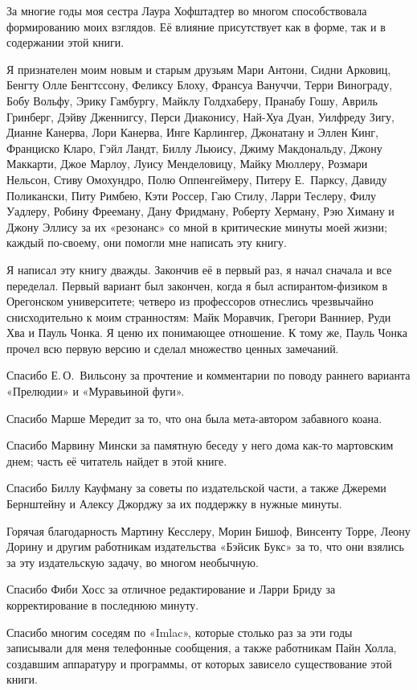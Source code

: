 \documentclass[../main.tex]{subfiles}
\begin{document}
За многие годы моя сестра Лаура Хофштадтер во многом способствовала формированию моих взглядов. Её влияние присутствует как в форме, так и в содержании этой книги.

Я признателен моим новым и старым друзьям Мари Антони, Сидни Арковиц, Бенгту Олле Бенгтссону, Феликсу Блоху, Франсуа Вануччи, Терри Винограду, Бобу Вольфу, Эрику Гамбургу, Майклу Голдхаберу, Пранабу Гошу, Авриль Гринберг, Дэйву Дженнигсу, Перси Диаконису, Най-Хуа Дуан, Уилфреду Зигу, Дианне Канерва, Лори Канерва, Инге Карлингер, Джонатану и Эллен Кинг, Франциско Кларо, Гэйл Ландт, Биллу Льюису, Джиму Макдональду, Джону Маккарти, Джое Марлоу, Луису Менделовицу, Майку Мюллеру, Розмари Нельсон, Стиву Омохундро, Полю Оппенгеймеру, Питеру Е.~Парксу, Давиду Поликански, Питу Римбею, Кэти Россер, Гаю Стилу, Ларри Теслеру, Филу Уадлеру, Робину Фрееману, Дану Фридману, Роберту Херману, Рэю Химану и Джону Эллису за их «резонанс» со мной в критические минуты моей жизни; каждый по-своему, они помогли мне написать эту книгу.

Я написал эту книгу дважды. Закончив её в первый раз, я начал сначала и все переделал. Первый вариант был закончен, когда я был аспирантом-физиком в Орегонском университете; четверо из профессоров отнеслись чрезвычайно снисходительно к моим странностям: Майк Моравчик, Грегори Ванниер, Руди Хва и Пауль Чонка. Я ценю их понимающее отношение. К тому же, Пауль Чонка прочел всю первую версию и сделал множество ценных замечаний.

Спасибо Е.\,О.~Вильсону за прочтение и комментарии по поводу раннего варианта «Прелюдии» и «Муравьиной фуги».

Спасибо Марше Мередит за то, что она была мета-автором забавного коана.

Спасибо Марвину Мински за памятную беседу у него дома как-то мартовским днем; часть её читатель найдет в этой книге.

Спасибо Биллу Кауфману за советы по издательской части, а также Джереми Бернштейну и Алексу Джорджу за их поддержку в нужные минуты.

Горячая благодарность Мартину Кесслеру, Морин Бишоф, Винсенту Торре, Леону Дорину и другим работникам издательства «Бэйсик Букс» за то, что они взялись за эту издательскую задачу, во многом необычную.

Спасибо Фиби Хосс за отличное редактирование и Ларри Бриду за корректирование в последнюю минуту.

Спасибо многим соседям по «Imlac», которые столько раз за эти годы записывали для меня телефонные сообщения, а также работникам Пайн Холла, создавшим аппаратуру и программы, от которых зависело существование этой книги.
\end{document}
